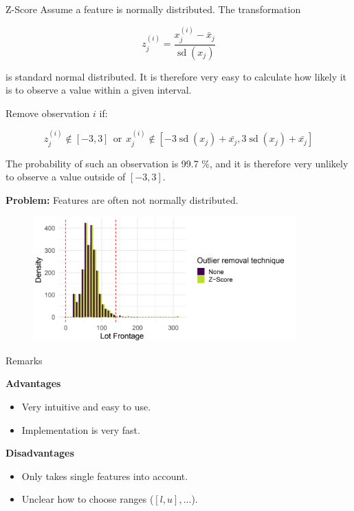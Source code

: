 \begin{vbframe}{Z-Score}
    Assume a feature is normally distributed. The transformation
    
    $$
        z_j^{(i)} = \frac{x_j^{(i)} - \bar{x}_j}{\operatorname{sd}(x_j)}
    $$
    \medskip
    
    is standard normal distributed. It is therefore very easy to calculate how likely it is to observe a value within a given interval.
    \medskip
    
    Remove observation $i$ if:
    
    $$
        z_j^{(i)} \notin [-3, 3] \ \ \text{or} \ \ x_j^{(i)} \notin [-3\operatorname{sd}(x_j) + \bar{x_j}, 3\operatorname{sd}(x_j) + \bar{x_j}]
    $$
    \medskip
    
    The probability of such an observation is 99.7 \%, and it is therefore very unlikely to observe a value outside of $[-3, 3]$.
    \medskip
    
    \textbf{Problem:} Features are often not normally distributed.
    \framebreak
    
    
    \vspace*{1cm}
    
    
    \begin{figure}
        \includegraphics[width = 0.9\textwidth]{figure_man/z-score.png}
    \end{figure}
    
    
\end{vbframe}

\begin{vbframe}{Remarks}
    \vspace{+.4cm}
    
    \textbf{Advantages}
    \vspace{+.4cm}
    
    \begin{itemize}
        \item Very intuitive and easy to use.
        \item Implementation is very fast.
    \end{itemize}
    \vspace{+.4cm}
    
    \textbf{Disadvantages}
    \vspace{+.4cm}
    
    \begin{itemize}
        \item Only takes single features into account.
        \item Unclear how to choose ranges ($[l, u], ...$).
    \end{itemize}
\end{vbframe}

